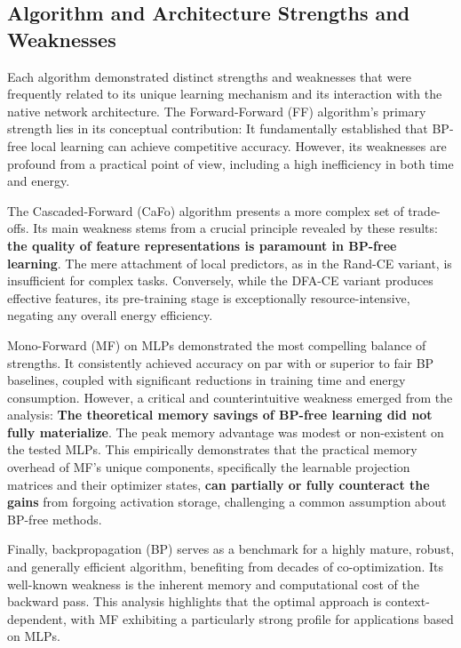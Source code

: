 \subsection{Algorithm and Architecture Strengths and Weaknesses}
\label{sec:discussion_strengths_weaknesses}

Each algorithm demonstrated distinct strengths and weaknesses that were frequently related to its unique learning mechanism and its interaction with the native network architecture. The Forward-Forward (FF) algorithm's primary strength lies in its conceptual contribution: It fundamentally established that BP-free local learning can achieve competitive accuracy. However, its weaknesses are profound from a practical point of view, including a high inefficiency in both time and energy.

The Cascaded-Forward (CaFo) algorithm presents a more complex set of trade-offs. Its main weakness stems from a crucial principle revealed by these results: \textbf{the quality of feature representations is paramount in BP-free learning}. The mere attachment of local predictors, as in the Rand-CE variant, is insufficient for complex tasks. Conversely, while the DFA-CE variant produces effective features, its pre-training stage is exceptionally resource-intensive, negating any overall energy efficiency.

Mono-Forward (MF) on MLPs demonstrated the most compelling balance of strengths. It consistently achieved accuracy on par with or superior to fair BP baselines, coupled with significant reductions in training time and energy consumption. However, a critical and counterintuitive weakness emerged from the analysis: \textbf{The theoretical memory savings of BP-free learning did not fully materialize}. The peak memory advantage was modest or non-existent on the tested MLPs. This empirically demonstrates that the practical memory overhead of MF's unique components, specifically the learnable projection matrices and their optimizer states, \textbf{can partially or fully counteract the gains} from forgoing activation storage, challenging a common assumption about BP-free methods.

Finally, backpropagation (BP) serves as a benchmark for a highly mature, robust, and generally efficient algorithm, benefiting from decades of co-optimization. Its well-known weakness is the inherent memory and computational cost of the backward pass. This analysis highlights that the optimal approach is context-dependent, with MF exhibiting a particularly strong profile for applications based on MLPs.

